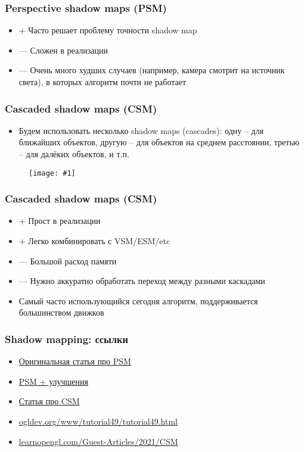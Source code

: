 \documentclass{beamer}
\newcommand{\slideimage}[1]{
  \begin{figure}
    \begin{adjustbox}{width=\textwidth, totalheight=\textheight-2\baselineskip-2\baselineskip,keepaspectratio}
      \texttt{[image: \#1]}
    \end{adjustbox}
  \end{figure}
}
\begin{document}
\begin{frame}[fragile]
\frametitle{Perspective shadow maps (PSM)}
\begin{itemize}
\item {\color{green}+} Часто решает проблему точности shadow map
\item {\color{red}—} Сложен в реализации
\item {\color{red}—} Очень много худших случаев (например, камера смотрит на источник света), в которых алгоритм почти не работает
\end{itemize}
\end{frame}

\begin{frame}[fragile]
\frametitle{Cascaded shadow maps (CSM)}
\begin{itemize}
\item Будем использовать несколько shadow maps (cascades): одну -- для ближайших объектов, другую -- для объектов на среднем расстоянии, третью -- для далёких объектов, и т.п.
\end{itemize}
\slideimage{csm.jpg}
\end{frame}

\begin{frame}[fragile]
\frametitle{Cascaded shadow maps (CSM)}
\begin{itemize}
\item {\color{green}+} Прост в реализации
\item {\color{green}+} Легко комбинировать с VSM/ESM/etc
\item {\color{red}—} Большой расход памяти
\item {\color{red}—} Нужно аккуратно обработать переход между разными каскадами
\item Самый часто использующийся сегодня алгоритм, поддерживается большинством движков
\end{itemize}
\end{frame}

\begin{frame}[fragile]
\frametitle{Shadow mapping: ссылки}
\begin{itemize}
\item \href{https://www-sop.inria.fr/reves/Basilic/2002/SD02/PerspectiveShadowMaps.pdf}{Оригинальная статья про PSM}
\item \href{https://developer.download.nvidia.com/books/HTML/gpugems/gpugems_ch14.html}{PSM + улучшения}
\item \href{https://developer.download.nvidia.com/SDK/10.5/opengl/src/cascaded_shadow_maps/doc/cascaded_shadow_maps.pdf}{Статья про CSM}
\item \href{https://ogldev.org/www/tutorial49/tutorial49.html}{ogldev.org/www/tutorial49/tutorial49.html}
\item \href{https://learnopengl.com/Guest-Articles/2021/CSM}{learnopengl.com/Guest-Articles/2021/CSM}
\end{itemize}
\end{frame}
\end{document}
